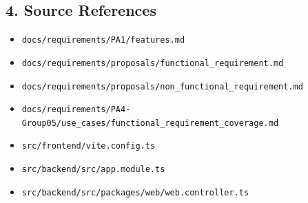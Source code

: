 \documentclass[12pt]{article}
\begin{document}
\hypertarget{sec:4-source-references}{}
\subsection*{4. Source References}
\par\medskip

\begin{itemize}
\item \texttt{docs/requirements/PA1/features.md}
\item \texttt{docs/requirements/proposals/functional\_requirement.md}
\item \texttt{docs/requirements/proposals/non\_functional\_requirement.md}
\item \texttt{docs/requirements/PA4-Group05/use\_cases/functional\_requirement\_coverage.md}
\item \texttt{src/frontend/vite.config.ts}
\item \texttt{src/backend/src/app.module.ts}
\item \texttt{src/backend/src/packages/web/web.controller.ts}
\end{itemize}
\par\medskip

\par\medskip
\hypertarget{sec:ui-prototype-specimens}{}
\end{document}
